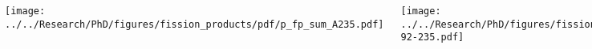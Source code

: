 \documentclass[compress,10pt]{beamer}
\begin{document}
\begin{frame}
\begin{columns}[c]
        \centering

        {}\texttt{[image: ../../Research/PhD/figures/fission\_products/pdf/p\_fp\_sum\_A235.pdf]} \\


        \centering

        {}\texttt{[image: ../../Research/PhD/figures/fission\_products/pdf/p\_fp\_1-92-235.pdf]}


        \centering

        {}\texttt{[image: ../../Research/PhD/figures/metastables/interesting/p\_95\_243\_0\_16.pdf]} \\

    \end{columns}

\end{frame}

\typeout{***********************************************************************************}
\end{document}
